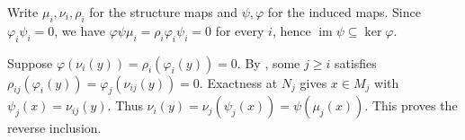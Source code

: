 Write $\mu_i,\nu_i,\rho_i$ for the structure maps and $\psi,\varphi$ for the induced maps. Since $\varphi_i\psi_i=0$, we have $\varphi\psi\mu_i=\rho_i\varphi_i\psi_i=0$ for every $i$, hence $\operatorname{im}\psi\subseteq\ker\varphi$.

Suppose $\varphi(\nu_i(y))=\rho_i(\varphi_i(y))=0$. By , some $j\geq i$ satisfies $\rho_{ij}(\varphi_i(y))=\varphi_j(\nu_{ij}(y))=0$. Exactness at $N_j$ gives $x\in M_j$ with $\psi_j(x)=\nu_{ij}(y)$. Thus $\nu_i(y)=\nu_j(\psi_j(x))=\psi(\mu_j(x))$. This proves the reverse inclusion.
